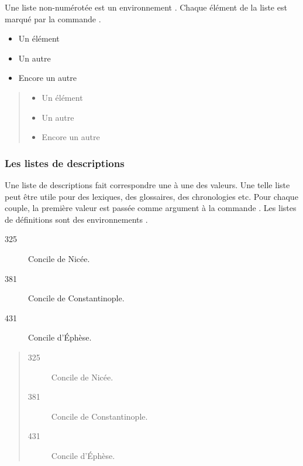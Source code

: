 Une liste non-numérotée est un environnement .
Chaque élément de la liste est marqué par la commande .

\begin{latexcode}
\begin{itemize}
	\item Un élément
	\item Un autre
	\item Encore un autre
\end{itemize}
\end{latexcode}

\begin{quotation}
\noindent\begin{itemize}
	\item Un élément
	\item Un autre
	\item Encore un autre
\end{itemize}
\end{quotation}

\subsubsection{Les listes de descriptions}

Une liste de descriptions fait correspondre une à une des valeurs. Une telle liste peut être utile pour des lexiques, des glossaires, des chronologies etc. Pour chaque couple, la première valeur est passée comme argument à la commande . Les listes de définitions sont des environnements .


\begin{latexcode}
\begin{description}
	\item[325]Concile de Nicée.
	\item[381]Concile de Constantinople.
	\item[431]Concile d'Éphèse.
\end{description}
\end{latexcode}
\begin{quotation}
\noindent\begin{description}
	\item[325]Concile de Nicée.
	\item[381]Concile de Constantinople.
	\item[431]Concile d'Éphèse.
\end{description}
\end{quotation}


